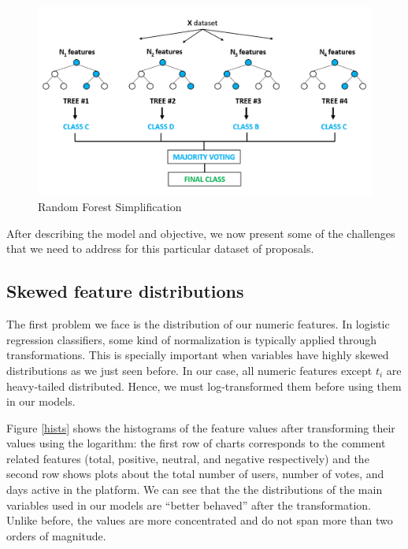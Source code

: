 \begin{figure}[h]
\centering
\includegraphics[width=\textwidth]{Figures/random_forests.png}
\caption{Random Forest Simplification}
\label{random_forest}
\end{figure}

After describing the model and objective, we now present some of the challenges that we need to address for this particular dataset of proposals.

\subsection{Skewed feature distributions}\label{sec:skewed}

The first problem we face is the distribution of our numeric features. In logistic regression classifiers, some kind of normalization is typically applied through transformations. This is specially important when variables have highly skewed distributions as we just seen before. In our case, all numeric features except $t_i$ are heavy-tailed distributed. Hence, we must log-transformed them before using them in our models.

Figure \ref{hists} shows the histograms of the feature values after transforming their values using the logarithm: the first row of charts corresponds to the comment related features (total, positive, neutral, and negative respectively) and the second row shows plots about the total number of users, number of votes, and days active in the platform.  We can see that the the distributions of the main variables used in our models are ``better behaved'' after the transformation.
Unlike before, the values are more concentrated and do not span more than two orders of magnitude.

